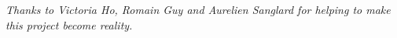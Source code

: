 \clearpage
\thispagestyle{empty}
\vspace*{\fill}
\begin{center}
\begin{minipage}{.6\textwidth}
\emph{Thanks to Victoria Ho, Romain Guy and Aurelien Sanglard for helping to make this project become reality.\\}
\end{minipage}
\end{center}
\vfill
\clearpage
